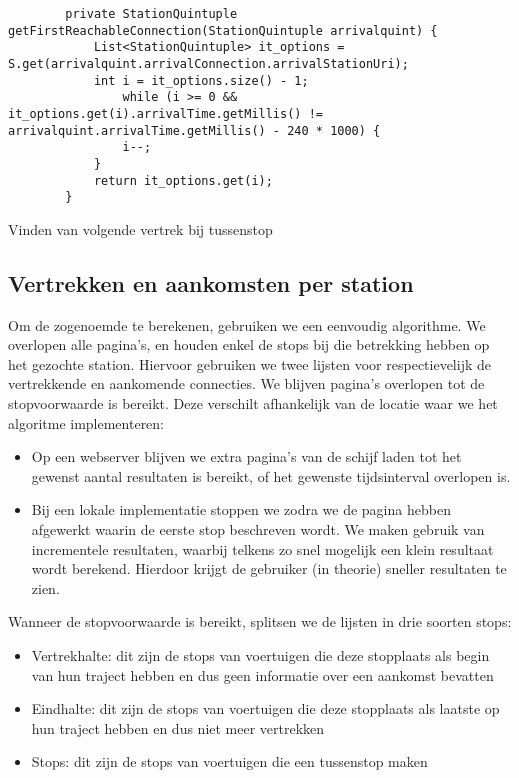 \begin{code}
	\begin{verbatim}
		private StationQuintuple getFirstReachableConnection(StationQuintuple arrivalquint) {
			List<StationQuintuple> it_options = S.get(arrivalquint.arrivalConnection.arrivalStationUri);
			int i = it_options.size() - 1;
				while (i >= 0 && it_options.get(i).arrivalTime.getMillis() != arrivalquint.arrivalTime.getMillis() - 240 * 1000) {
				i--;
			}
			return it_options.get(i);
		}
	\end{verbatim}
	\caption[CSA: Journey extraction bij tussenstops]{Vinden van volgende vertrek bij tussenstop}
	\label{code:2:csaJourneyExtractionReachable}
\end{code}

\subsection{Vertrekken en aankomsten per station}
Om de zogenoemde  te berekenen, gebruiken we een eenvoudig algorithme. We overlopen alle pagina's, en houden enkel de stops bij die betrekking hebben op het gezochte station. Hiervoor gebruiken we twee lijsten voor respectievelijk de vertrekkende en aankomende connecties. We blijven pagina's overlopen tot de stopvoorwaarde is bereikt. Deze verschilt afhankelijk van de locatie waar we het algoritme implementeren:
\begin{itemize}
	\item Op een webserver blijven we extra pagina's van de schijf laden tot het gewenst aantal resultaten is bereikt, of het gewenste tijdsinterval overlopen is.
	\item Bij een lokale implementatie stoppen we zodra we de pagina hebben afgewerkt waarin de eerste stop beschreven wordt. We maken gebruik van incrementele resultaten, waarbij telkens zo snel mogelijk een klein resultaat wordt berekend. Hierdoor krijgt de gebruiker (in theorie) sneller resultaten te zien.
\end{itemize}

Wanneer de stopvoorwaarde is bereikt, splitsen we de lijsten in drie soorten stops:
\begin{itemize}
	\item Vertrekhalte:  dit zijn de stops van voertuigen die deze stopplaats als begin van hun traject hebben en dus geen informatie over een aankomst bevatten
	\item Eindhalte: dit zijn de stops van voertuigen die deze stopplaats als laatste op hun traject hebben en dus niet meer vertrekken
	\item Stops: dit zijn de stops van voertuigen die een tussenstop maken
\end{itemize}

